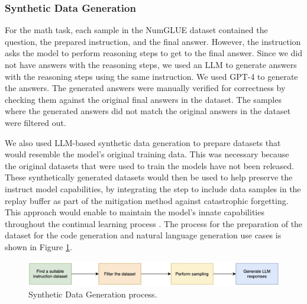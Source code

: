 \subsubsection{Synthetic Data Generation} \label{Synthetic Data Generation}
For the math task, each sample in the NumGLUE dataset contained the question, the prepared instruction, and the final answer. However, the instruction asks the model to perform reasoning steps to get to the final answer. Since we did not have answers with the reasoning steps, we used an LLM to generate answers with the reasoning steps using the same instruction. We used GPT-4 to generate the answers. The generated answers were manually verified for correctness by checking them against the original final answers in the dataset. The samples where the generated answers did not match the original answers in the dataset were filtered out.

We also used LLM-based synthetic data generation to prepare datasets that would resemble the model's original training data. This was necessary because the original datasets that were used to train the models have not been released. These synthetically generated datasets would then be used to help preserve the instruct model capabilities, by integrating the step to include data samples in the replay buffer as part of the mitigation method against catastrophic forgetting. This approach would enable to maintain the model's innate capabilities throughout the continual learning process \cite{guo2024efficient}. The process for the preparation of the dataset for the code generation and natural language generation use cases is shown in Figure \ref{fig:SyntheticDataGen}.

\begin{figure}[h]
    \centering
    \includegraphics[width=1\textwidth]{Figures/methodology/synthetic_data_gen.jpeg} %
    \caption{Synthetic Data Generation process.}
    \label{fig:SyntheticDataGen}
\end{figure}

